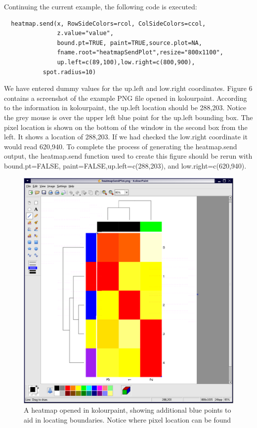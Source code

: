 \documentclass[]{article}
\begin{document}
\indent Continuing the current example, the following code is executed:
\begin{verbatim}
  heatmap.send(x, RowSideColors=rcol, ColSideColors=ccol,
               z.value="value",
               bound.pt=TRUE, paint=TRUE,source.plot=NA,
               fname.root="heatmapSendPlot",resize="800x1100",
               up.left=c(89,100),low.right=c(800,900),
	       spot.radius=10)
\end{verbatim}

We have entered dummy values for the up.left and low.right coordinates. Figure 6 contains a screenshot of the example PNG file opened in kolourpaint. According to the information in kolourpaint, the up.left location should be 288,203. Notice the grey mouse is over the upper left blue point for the up.left bounding box. The pixel location is shown on the bottom of the window in the second box from the left. It shows a location of 288,203. If we had checked the low.right coordinate it would read 620,940. To complete the process of generating the heatmap.send output, the heatmap.send function used to create this figure should be rerun with bound.pt=FALSE, paint=FALSE,up.left=c(288,203), and low.right=c(620,940).\newline

\begin{center}
\begin{figure}
\includegraphics{heatmapPaint}
\caption{A heatmap opened in kolourpaint, showing additional blue points to aid in locating boundaries. Notice where pixel location can be found}
\end{figure}
\end{center}
\end{document}
